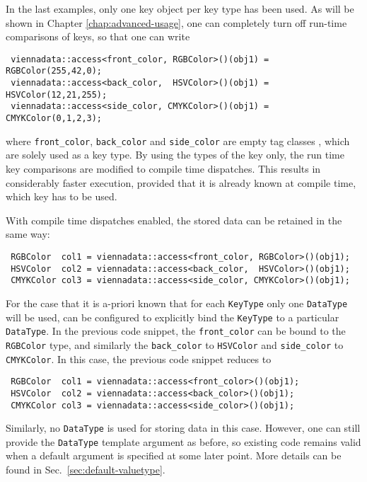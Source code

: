 In the last examples, only one key object per key type has been used. As will be shown in 
Chapter \ref{chap:advanced-usage}, one can completely turn off run-time comparisons of keys,
so that one can write
\begin{lstlisting}
 viennadata::access<front_color, RGBColor>()(obj1) = RGBColor(255,42,0);
 viennadata::access<back_color,  HSVColor>()(obj1) = HSVColor(12,21,255);
 viennadata::access<side_color, CMYKColor>()(obj1) = CMYKColor(0,1,2,3);
\end{lstlisting}
where \lstinline|front_color|, \lstinline|back_color| and \lstinline|side_color| are empty tag classes \cite{Alexandrescu:ModernCpp,Vandevoorde:CppTemplates}, which are solely used as a key type.
By using the types of the key only, the run time key comparisons are modified to compile time dispatches. This results in considerably faster
execution, provided that it is already known at compile time, which key has to be used.


With compile time dispatches enabled, the stored data can be retained in the same way:
\begin{lstlisting}
 RGBColor  col1 = viennadata::access<front_color, RGBColor>()(obj1);
 HSVColor  col2 = viennadata::access<back_color,  HSVColor>()(obj1);
 CMYKColor col3 = viennadata::access<side_color, CMYKColor>()(obj1);
\end{lstlisting}
For the case that it is a-priori known that for each \lstinline|KeyType| only one \lstinline|DataType| will be used, {\ViennaData}
can be configured to explicitly bind the \lstinline|KeyType| to a particular \lstinline|DataType|. In the previous code snippet,
the \lstinline|front_color| can be bound to the \lstinline|RGBColor| type, and similarly the \lstinline|back_color| to \lstinline|HSVColor|
and \lstinline|side_color| to \lstinline|CMYKColor|. In this case, the previous code snippet reduces to
\begin{lstlisting}
 RGBColor  col1 = viennadata::access<front_color>()(obj1);
 HSVColor  col2 = viennadata::access<back_color>()(obj1);
 CMYKColor col3 = viennadata::access<side_color>()(obj1);
\end{lstlisting}
Similarly, no \lstinline|DataType| is used for storing data in this case. However, one can still provide the \lstinline|DataType| template argument
as before, so existing code remains valid when a default argument is specified at some later point. More details can be found in Sec.~\ref{sec:default-valuetype}.


